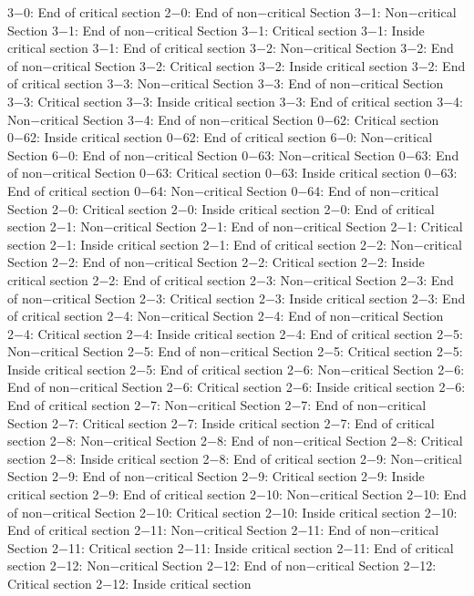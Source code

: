3−0: End of critical section
2−0: End of non−critical Section
3−1: Non−critical Section
3−1: End of non−critical Section
3−1: Critical section
3−1: Inside critical section
3−1: End of critical section
3−2: Non−critical Section
3−2: End of non−critical Section
3−2: Critical section
3−2: Inside critical section
3−2: End of critical section
3−3: Non−critical Section
3−3: End of non−critical Section
3−3: Critical section
3−3: Inside critical section
3−3: End of critical section
3−4: Non−critical Section
3−4: End of non−critical Section
0−62: Critical section
0−62: Inside critical section
0−62: End of critical section
6−0: Non−critical Section
6−0: End of non−critical Section
0−63: Non−critical Section
0−63: End of non−critical Section
0−63: Critical section
0−63: Inside critical section
0−63: End of critical section
0−64: Non−critical Section
0−64: End of non−critical Section
2−0: Critical section
2−0: Inside critical section
2−0: End of critical section
2−1: Non−critical Section
2−1: End of non−critical Section
2−1: Critical section
2−1: Inside critical section
2−1: End of critical section
2−2: Non−critical Section
2−2: End of non−critical Section
2−2: Critical section
2−2: Inside critical section
2−2: End of critical section
2−3: Non−critical Section
2−3: End of non−critical Section
2−3: Critical section
2−3: Inside critical section
2−3: End of critical section
2−4: Non−critical Section
2−4: End of non−critical Section
2−4: Critical section
2−4: Inside critical section
2−4: End of critical section
2−5: Non−critical Section
2−5: End of non−critical Section
2−5: Critical section
2−5: Inside critical section
2−5: End of critical section
2−6: Non−critical Section
2−6: End of non−critical Section
2−6: Critical section
2−6: Inside critical section
2−6: End of critical section
2−7: Non−critical Section
2−7: End of non−critical Section
2−7: Critical section
2−7: Inside critical section
2−7: End of critical section
2−8: Non−critical Section
2−8: End of non−critical Section
2−8: Critical section
2−8: Inside critical section
2−8: End of critical section
2−9: Non−critical Section
2−9: End of non−critical Section
2−9: Critical section
2−9: Inside critical section
2−9: End of critical section
2−10: Non−critical Section
2−10: End of non−critical Section
2−10: Critical section
2−10: Inside critical section
2−10: End of critical section
2−11: Non−critical Section
2−11: End of non−critical Section
2−11: Critical section
2−11: Inside critical section
2−11: End of critical section
2−12: Non−critical Section
2−12: End of non−critical Section
2−12: Critical section
2−12: Inside critical section
